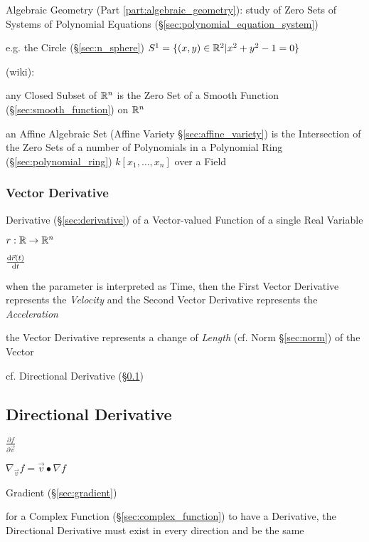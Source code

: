 \fist Algebraic Geometry (Part \ref{part:algebraic_geometry}): study of Zero
Sets of Systems of Polynomial Equations
(\S\ref{sec:polynomial_equation_system})

e.g. the Circle (\S\ref{sec:n_sphere}) $S^1 = \{ (x,y) \in \mathbb{R}^2 | x^2 + y^2
- 1 = 0 \}$

(wiki):

any Closed Subset of $\mathbb{R}^n$ is the Zero Set of a Smooth Function
(\S\ref{sec:smooth_function}) on $\mathbb{R}^n$

an Affine Algebraic Set (Affine Variety \S\ref{sec:affine_variety}) is the
Intersection of the Zero Sets of a number of Polynomials in a Polynomial Ring
(\S\ref{sec:polynomial_ring}) $k[x_1,\ldots,x_n]$ over a Field



\subsubsection{Vector Derivative}\label{sec:vector_derivative}

Derivative (\S\ref{sec:derivative}) of a Vector-valued Function of a single Real
Variable

$r : \mathbb{R} \rightarrow \mathbb{R}^n$

$\frac{\mathrm{d}\vec{r}(t)}{\mathrm{d}t}$

when the parameter is interpreted as Time, then the First Vector Derivative
represents the \emph{Velocity} and the Second Vector Derivative represents the
\emph{Acceleration}

the Vector Derivative represents a change of \emph{Length} (cf. Norm
\S\ref{sec:norm}) of the Vector

cf. Directional Derivative (\S\ref{sec:directional_derivative})



\subsection{Directional Derivative}\label{sec:directional_derivative}

$\frac{\partial{f}}{\partial{\vec{v}}}$

$\nabla_{\vec{v}} f = \vec{v}\bullet \nabla{f}$

Gradient (\S\ref{sec:gradient})

for a Complex Function (\S\ref{sec:complex_function}) to have a Derivative, the
Directional Derivative must exist in every direction and be the same

